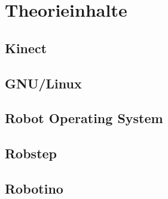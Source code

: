 
\chapter{Theorieinhalte}
	\section{Kinect}
	\section{GNU/Linux}
	\section{Robot Operating System}
	\section{Robstep}
	\section{Robotino}